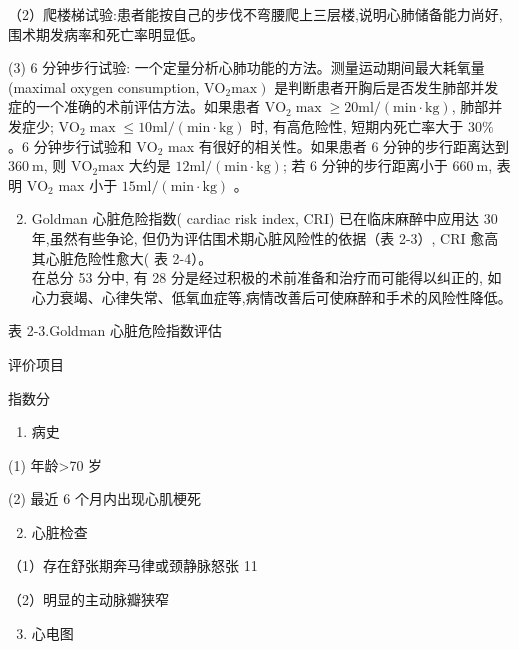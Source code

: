 \documentclass[10pt]{article}
\begin{document}
（2）爬楼梯试验:患者能按自己的步伐不弯腰爬上三层楼,说明心肺储备能力尚好,围术期发病率和死亡率明显低。

(3) 6 分钟步行试验: 一个定量分析心肺功能的方法。测量运动期间最大耗氧量 (maximal oxygen consumption, $\left.\mathrm{VO}_{2} \mathrm{max}\right)$ 是判断患者开胸后是否发生肺部并发症的一个准确的术前评估方法。如果患者 $\mathrm{VO}_{2} \max \geqslant 20 \mathrm{ml} /(\mathrm{min} \cdot \mathrm{kg})$, 肺部并发症少; $\mathrm{VO}_{2} \max \leqslant 10 \mathrm{ml} /(\mathrm{min} \cdot \mathrm{kg})$ 时, 有高危险性, 短期内死亡率大于 $30 \%$ 。6 分钟步行试验和 $\mathrm{VO}_{2}$ max 有很好的相关性。如果患者 6 分钟的步行距离达到 $360 \mathrm{~m}$, 则 $\mathrm{VO}_{2} \mathrm{max}$ 大约是 $12 \mathrm{ml} /(\mathrm{min} \cdot \mathrm{kg})$; 若 6 分钟的步行距离小于 $660 \mathrm{~m}$, 表明 $\mathrm{VO}_{2}$ max 小于 $15 \mathrm{ml} /(\mathrm{min} \cdot \mathrm{kg})$ 。

\begin{enumerate}
  \setcounter{enumi}{1}
  \item Goldman 心脏危险指数( cardiac risk index, CRI) 已在临床麻醉中应用达 30 年,虽然有些争论, 但仍为评估围术期心脏风险性的依据（表 2-3）, CRI 愈高其心脏危险性愈大( 表 2-4）。\\
在总分 53 分中, 有 28 分是经过积极的术前准备和治疗而可能得以纠正的, 如心力衰竭、心律失常、低氧血症等,病情改善后可使麻醉和手术的风险性降低。
\end{enumerate}

表 2-3.Goldman 心脏危险指数评估

评价项目

指数分

\begin{enumerate}
  \item 病史
\end{enumerate}

(1) 年龄>70 岁

(2) 最近 6 个月内出现心肌梗死

\begin{enumerate}
  \setcounter{enumi}{1}
  \item 心脏检查
\end{enumerate}

（1）存在舒张期奔马律或颈静脉怒张 11

（2）明显的主动脉瓣狭窄

\begin{enumerate}
  \setcounter{enumi}{2}
  \item 心电图
\end{enumerate}
\end{document}
